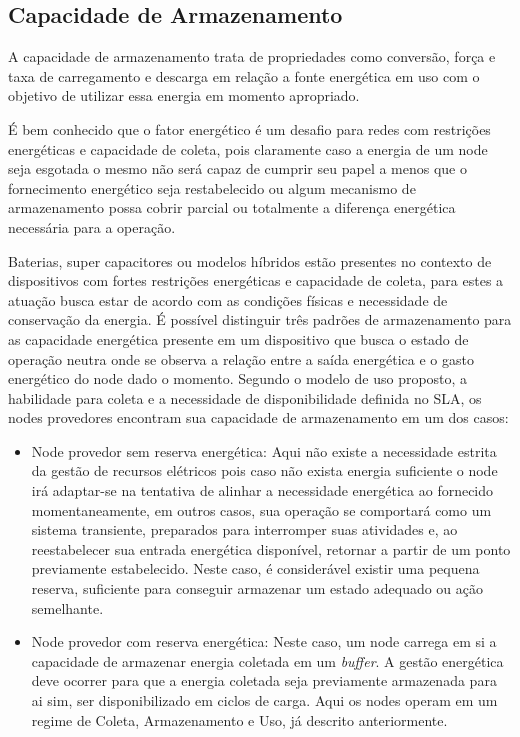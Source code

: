 \subsection{Capacidade de Armazenamento}
A capacidade de armazenamento trata de propriedades como conversão, força e taxa de carregamento e descarga em relação a fonte energética em uso com o objetivo de utilizar essa energia em momento apropriado. 

É bem conhecido que o fator energético é um desafio para redes com restrições energéticas e capacidade de coleta, pois claramente caso a energia de um node seja esgotada o mesmo não será capaz de cumprir seu papel a menos que o fornecimento energético seja restabelecido ou algum mecanismo de armazenamento possa cobrir parcial ou totalmente a diferença energética necessária para a operação.

Baterias, super capacitores ou modelos híbridos estão presentes no contexto de dispositivos com fortes restrições energéticas e capacidade de coleta, para estes a atuação busca estar de acordo com as condições físicas e necessidade de conservação da energia. É possível distinguir três padrões de armazenamento para as capacidade energética presente em um dispositivo que busca o estado de operação neutra onde se observa a relação entre a saída energética e o gasto energético do node dado o momento. Segundo o modelo de uso proposto, a habilidade para coleta e a necessidade de disponibilidade definida no \acs{SLA}, os nodes provedores encontram sua capacidade de armazenamento em um dos casos:

\begin{itemize}
    \item Node provedor sem reserva energética: Aqui não existe a necessidade estrita da gestão de recursos elétricos pois caso não exista energia suficiente o node irá adaptar-se na tentativa de alinhar a necessidade energética ao fornecido momentaneamente, em outros casos, sua operação se comportará como um sistema transiente, preparados para interromper suas atividades e, ao reestabelecer sua entrada energética disponível, retornar a partir de um ponto previamente estabelecido. Neste caso, é considerável existir uma pequena reserva, suficiente para conseguir armazenar um estado adequado ou ação semelhante.
    
    \item Node provedor com reserva energética: Neste caso, um node carrega em si a capacidade de armazenar energia coletada em um \textit{buffer}. A gestão energética deve ocorrer para que a energia coletada seja previamente armazenada para ai sim, ser disponibilizado em ciclos de carga. Aqui os nodes operam em um regime de Coleta, Armazenamento e Uso, já descrito anteriormente.
\end{itemize}

